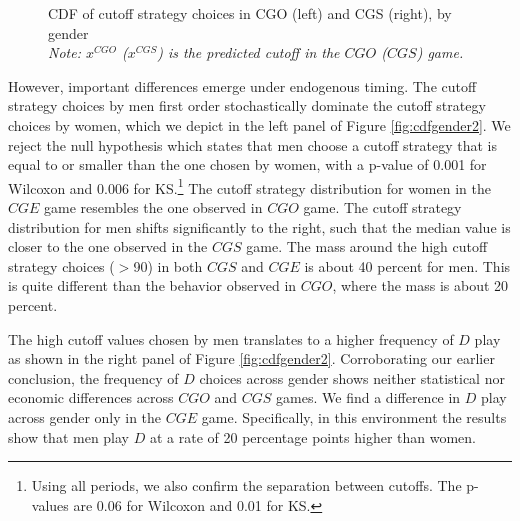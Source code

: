 \documentclass[12pt,english]{article}
\begin{document}
\begin{center}
\begin{figure}[ht]
\centering{}%
\begin{minipage}[t]{0.45\columnwidth}%
%
\end{minipage}%
\begin{minipage}[t]{0.45\columnwidth}%
%
\end{minipage} 
\caption{CDF of cutoff strategy choices in CGO (left) and CGS (right), by gender \\\footnotesize{\textit{Note: $x^{CGO}$ ($x^{CGS}$) is the predicted cutoff in the $CGO$ ($CGS$) game.}} }
\label{fig:cdfgender1}\end{figure}
\par\end{center}
However, important differences emerge under endogenous timing. The cutoff strategy choices by men first order stochastically dominate the cutoff strategy choices by women, which we depict in the left panel of Figure \ref{fig:cdfgender2}. We reject the null hypothesis which states that men choose a cutoff strategy that is equal to or smaller than the one chosen by women, with a p-value of 0.001 for Wilcoxon and 0.006 for KS.\footnote{Using all periods, we also confirm the separation between cutoffs. The p-values are 0.06 for Wilcoxon and 0.01 for KS.} The cutoff strategy distribution for women in the $CGE$ game resembles the one observed in $CGO$ game. The cutoff strategy distribution for men shifts significantly to the right, such that the median value is closer to the one observed in the $CGS$ game. The mass around the high cutoff strategy choices ($>$90) in both $CGS$ and $CGE$ is about 40 percent for men. This is quite different than the behavior observed in $CGO$, where the mass is about 20 percent. 

The high cutoff values chosen by men translates to a higher frequency of $D$ play as shown in the right panel of Figure \ref{fig:cdfgender2}. Corroborating our earlier conclusion, the frequency of $D$ choices across gender shows neither statistical nor economic differences across $CGO$ and $CGS$ games. We find a difference in $D$ play across gender only in the $CGE$ game. Specifically, in this environment the results show that men play $D$ at a rate of 20 percentage points higher than women. 
\end{document}

